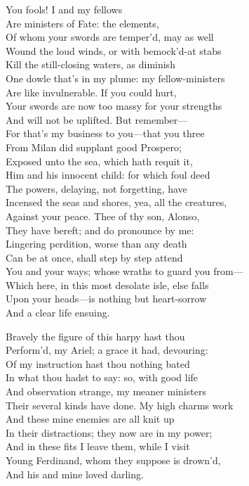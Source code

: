 \begin{verse_speech}[Ariel]
You fools! I and my fellows\\
Are ministers of Fate: the elements,\\
Of whom your swords are temper'd, may as well\\
Wound the loud winds, or with bemock'd-at stabs\\
Kill the still-closing waters, as diminish\\
One dowle that's in my plume: my fellow-ministers\\
Are like invulnerable. If you could hurt,\\
Your swords are now too massy for your strengths\\
And will not be uplifted. But remember—\\
For that's my business to you—that you three\\
From Milan did supplant good Prospero;\\
Exposed unto the sea, which hath requit it,\\
Him and his innocent child: for which foul deed\\
The powers, delaying, not forgetting, have\\
Incensed the seas and shores, yea, all the creatures,\\
Against your peace. Thee of thy son, Alonso,\\
They have bereft; and do pronounce by me:\\
Lingering perdition, worse than any death\\
Can be at once, shall step by step attend\\
You and your ways; whose wraths to guard you from—\\
Which here, in this most desolate isle, else falls\\
Upon your heads—is nothing but heart-sorrow\\
And a clear life ensuing.
\end{verse_speech}



\begin{verse_speech}[Prospero] 
Bravely the figure of this harpy hast thou\\
Perform'd, my Ariel; a grace it had, devouring:\\
Of my instruction hast thou nothing bated\\
In what thou hadst to say: so, with good life\\
And observation strange, my meaner ministers\\
Their several kinds have done. My high charms work\\
And these mine enemies are all knit up\\
In their distractions; they now are in my power;\\
And in these fits I leave them, while I visit\\
Young Ferdinand, whom they suppose is drown'd,\\
And his and mine loved darling.
\end{verse_speech}

